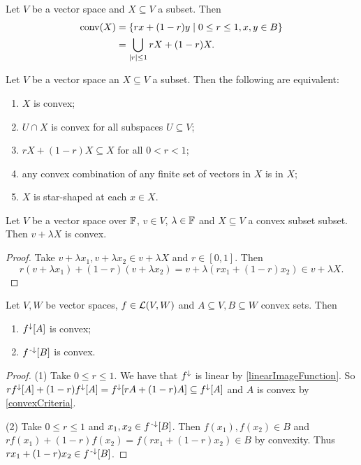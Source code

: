 \begin{lemma}
Let $V$ be a vector space and $X\subseteq V$ a subset. Then 
\begin{align*}
\operatorname{conv}(X) &= \left\{ rx + (1-r)y \;\middle|\; 0\leq r \leq 1, x,y\in B \right\} \\
&= \bigcup_{|r|\leq 1} rX + (1-r)X.
\end{align*}
\end{lemma}

\begin{lemma} \label{convexCriteria}
Let $V$ be a vector space an $X\subseteq V$ a subset. Then the following are equivalent:
\begin{enumerate}
\item $X$ is convex;
\item $U\cap X$ is convex for all subspaces $U\subseteq V$;
\item $rX + (1-r)X \subseteq X$ for all $0< r < 1$;
\item any convex combination of any finite set of vectors in $X$ is in $X$;
\item $X$ is star-shaped at each $x\in X$.
\end{enumerate}
\end{lemma}

\begin{lemma} \label{translationScalingConvexSet}
Let $V$ be a vector space over $\mathbb{F}$, $v\in V$, $\lambda\in \mathbb{F}$ and $X\subseteq V$ a convex subset subset. Then $v+\lambda X$ is convex.
\end{lemma}
\begin{proof}
Take $v+\lambda x_1, v+\lambda x_2 \in v+\lambda X$ and $r\in [0,1]$. Then
\[ r(v+\lambda x_1) + (1-r)(v+\lambda x_2) = v + \lambda(rx_1 + (1-r)x_2) \in v+\lambda X. \]
\end{proof}

\begin{lemma} \label{imagePreimageConvexSet}
Let $V,W$ be vector spaces, $f\in \operatorname{\mathcal{L}}(V,W)$ and $A\subseteq V, B\subseteq W$ convex sets. Then
\begin{enumerate}
\item $f^\downarrow[A]$ is convex;
\item $f^{\text{\hspace{0.15em}-}\downarrow}[B]$ is convex.
\end{enumerate}
\end{lemma}
\begin{proof}
(1) Take $0\leq r \leq 1$. We have that $f^\downarrow$ is linear by \ref{linearImageFunction}. So $rf^\downarrow[A] + (1-r)f^\downarrow[A] = f^\downarrow[rA + (1-r)A] \subseteq f^\downarrow[A]$ and $A$ is convex by \ref{convexCriteria}.

(2) Take $0\leq r \leq 1$ and $x_1,x_2\in f^{\text{\hspace{0.15em}-}\downarrow}[B]$. Then $f(x_1),f(x_2)\in B$ and $rf(x_1) + (1-r)f(x_2) = f(rx_1 + (1-r)x_2)\in B$ by convexity. Thus $rx_1 + (1-r)x_2\in f^{\text{\hspace{0.15em}-}\downarrow}[B]$.
\end{proof}

